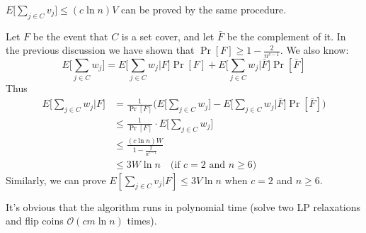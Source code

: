 \documentclass{article}
\begin{document}
$E\big[\sum_{j \in C}v_j\big] \leq (c\ln{n})V$ can be proved by the same procedure. \par
Let $F$ be the event that $C$ is a set cover, and let $\bar{F}$ be the complement of it. In the previous discussion we have shown that $\Pr[F] \geq 1 - \frac{2}{n^{c-1}}$. We also know:
$$E\Bigg[\sum_{j \in C}w_j\Bigg] = E\Bigg[\sum_{j \in C}w_j\Bigg|F\Bigg]\Pr[F] 
+ E\Bigg[\sum_{j \in C}w_j\Bigg|\bar{F}\Bigg]\Pr[\bar{F}]$$
Thus
\begin{align*}
	E\Bigg[\sum_{j \in C}w_j\Bigg|F\Bigg] 
	&= \frac{1}{\Pr[F]}\Bigg(E\Bigg[\sum_{j \in C}w_j\Bigg] 
	- E\Bigg[\sum_{j \in C}w_j\Bigg|\bar{F}\Bigg]\Pr[\bar{F}]\Bigg) \\
	&\leq \frac{1}{\Pr[F]} \cdot E\Bigg[\sum_{j \in C}w_j\Bigg] \\
	&\leq \frac{(c\ln{n})W}{1 - \frac{2}{n^{c-1}}} \\
	&\leq 3W\ln{n} \quad \text{(if $c = 2$ and $n \geq 6$)}
\end{align*}
Similarly, we can prove $E[\sum_{j \in C}v_j|F] \leq 3V\ln{n}$ when $c = 2$ and $n \geq 6$.\par
It's obvious that the algorithm runs in polynomial time (solve two LP relaxations and flip coins $\mathcal{O}(cm\ln{n})$ times).
\end{document}
